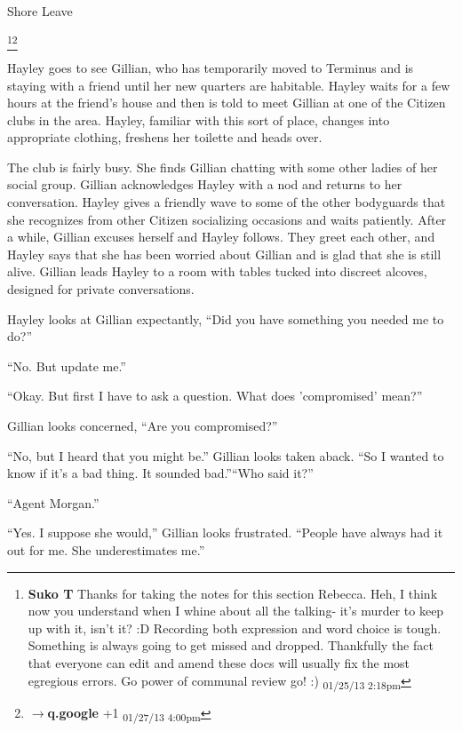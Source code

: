  {\LARGE Shore Leave } 


\footnote{\textbf{Suko T }Thanks for taking the notes for this section Rebecca.   Heh, I think now you understand when I whine about all the talking- it's murder to keep up with it, isn't it? :D  Recording both expression and word choice is tough.  Something is always going to get missed and dropped.  Thankfully the fact that everyone can edit and amend these docs will usually fix the most egregious errors.  Go power of communal review go! :) \textsubscript{01/25/13 2:18pm}}\footnote{$\rightarrow$\textbf{q.google }+1 \textsubscript{01/27/13 4:00pm}}

Hayley goes to see Gillian, who has temporarily moved to Terminus and is staying with a friend until her new quarters are habitable.  Hayley waits for a few hours at the friend's house and then is told to meet Gillian at one of the Citizen clubs in the area.  Hayley, familiar with this sort of place, changes into appropriate clothing, freshens her toilette and heads over.  



The club is fairly busy.  She finds Gillian chatting with some other ladies of her social group.  Gillian acknowledges Hayley with a nod and returns to her conversation.  Hayley gives a friendly wave to some of the other bodyguards that she recognizes from other Citizen socializing occasions and waits patiently.  After a while, Gillian excuses herself and Hayley follows.  They greet each other, and Hayley says that she has been worried about Gillian and is glad that she is still alive.  Gillian leads Hayley to a room with tables tucked into discreet alcoves, designed for private conversations. 



Hayley looks at Gillian expectantly, ``Did you have something you needed me to do?''

``No.  But update me.''

``Okay.  But first I have to ask a question.  What does 'compromised' mean?''

Gillian looks concerned, ``Are you compromised?''

``No, but I heard that you might be.''  Gillian looks taken aback. ``So I wanted to know if it's a bad thing.  It sounded bad.''``Who said it?''

``Agent Morgan.''

``Yes.  I suppose she would,'' Gillian looks frustrated.  ``People have always had it out for me.  She underestimates me.''

